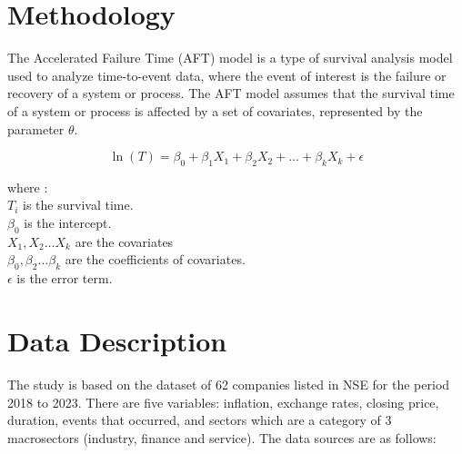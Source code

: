 \documentclass[twoside,a4paper,12pt]{article}
\begin{document}
\section*{Methodology} 
\noindent The Accelerated Failure Time (AFT) model is a type of survival analysis model used to analyze time-to-event data, where the event of interest is the failure or recovery of a system or process. The AFT model assumes that the survival time of a system or process is affected by a set of covariates, represented by the parameter $\theta$.  


\begin{equation}	
		\ln(T) = \beta_0 + \beta_1 X_1 + \beta_2 X_2 + \dots + \beta_k X_k + \epsilon \label{eq:1} 	
\end{equation}

where :\\
$T_i$ 	is the survival time.\\
$\beta_0$ 	is the intercept.\\
$X_1,X_2 \dots X_k$	 are the covariates\\
$\beta_0,\beta_2 \dots \beta_k$ 	are the coefficients of covariates.\\
$ \epsilon$      is the error term.\\

\section*{Data Description}

The study is based on the dataset of 62 companies listed in NSE for the period 2018 to 2023. There are five variables: inflation, exchange rates, closing price, duration, events that occurred, and  sectors which are a category of 3 macrosectors (industry, finance and service). The data sources are as follows:
\end{document}
